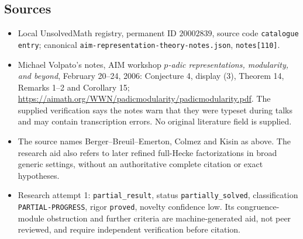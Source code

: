 \documentclass[11pt]{article}
\begin{document}
\subsection{Sources}
\begin{itemize}
\item Local UnsolvedMath registry, permanent ID $20002839$, source code \texttt{catalogue entry}; canonical \texttt{aim-representation-theory-notes.json}, \texttt{notes[110]}.
\item Michael Volpato's notes, AIM workshop \emph{$p$-adic representations, modularity, and beyond}, February 20--24, 2006: Conjecture 4, display (3), Theorem 14, Remarks 1--2 and Corollary 15; \url{https://aimath.org/WWN/padicmodularity/padicmodularity.pdf}. The supplied verification says the notes warn that they were typeset during talks and may contain transcription errors. No original literature field is supplied.
\item The source names Berger--Breuil--Emerton, Colmez and Kisin as above. The research aid also refers to later refined full-Hecke factorizations in broad generic settings, without an authoritative complete citation or exact hypotheses.
\item Research attempt 1: \texttt{partial\_result}, status \texttt{partially\_solved}, classification \texttt{PARTIAL-PROGRESS}, rigor \texttt{proved}, novelty confidence low. Its congruence-module obstruction and further criteria are machine-generated aid, not peer reviewed, and require independent verification before citation.
\end{itemize}
\end{document}
